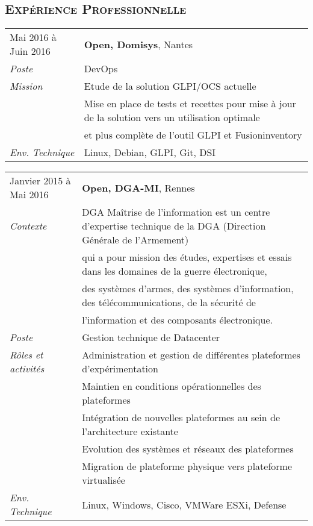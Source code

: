 \documentclass[a4paper,8pt]{article}
\newcommand{\hsubsection}[1]{\subsection*{\fontfamily{phv}\selectfont\textsc{#1}}}
\begin{document}
\hsubsection{Expérience Professionnelle}
\begin{tabular}{P{3.5cm}|p{13cm}}
Mai 2016 à Juin 2016		& \textbf{Open, Domisys}, Nantes\\
\textsl{Poste}			& DevOps\\
\textsl{Mission}		& Etude de la solution GLPI/OCS actuelle\\
				& Mise en place de tests et recettes pour mise à jour de la solution vers un utilisation optimale\\
				& et plus complète de l'outil GLPI et Fusioninventory\\
\textsl{Env. Technique}		& Linux, Debian, GLPI, Git, DSI \\
\end{tabular}
\begin{tabular}{P{3.5cm}|p{13cm}}
Janvier 2015 à Mai 2016		& \textbf{Open, DGA-MI}, Rennes\\
\textsl{Contexte}      		& DGA Maîtrise de l'information est un centre d'expertise technique de la DGA (Direction Générale de l'Armement)\\
				& qui a pour mission des études, expertises et essais dans les domaines de la guerre électronique,\\
				& des systèmes d'armes, des systèmes d'information, des télécommunications, de la sécurité de \\
				& l'information et des composants électronique.\\
\textsl{Poste}			& Gestion technique de Datacenter\\
\textsl{Rôles et activités}	& Administration et gestion de différentes plateformes d'expérimentation\\
				& Maintien en conditions opérationnelles des plateformes\\
				& Intégration de nouvelles plateformes au sein de l'architecture existante\\
				& Evolution des systèmes et réseaux des plateformes\\
				& Migration de plateforme physique vers plateforme virtualisée\\
\textsl{Env. Technique}		& Linux, Windows, Cisco, VMWare ESXi, Defense\\
\end{tabular}
\end{document}
